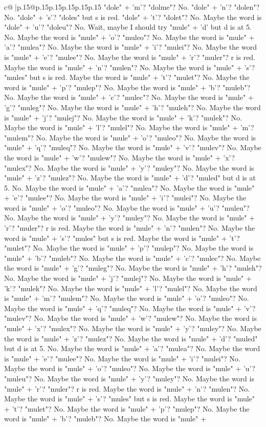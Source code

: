 \documentclass{article}
\begin{document}
{\begin{supertabular}{c@{$\;$}|p{.15\linewidth}@{}p{.15\linewidth}p{.15\linewidth}p{.15\linewidth}p{.15\linewidth}p{.15\linewidth}}
{{{"dole" + 'm'? "dolme"? No. "dole" + 'n'? "dolen"? No. "dole" + 's'? "doles" but s is red. "dole" + 't'? "dolet"? No. Maybe the word is "dole" + 'u'? "doleu"? No. Wait, maybe I should try "mule" + 'd' but d is at 5. No. Maybe the word is "mule" + 'o'? "muleo"? No. Maybe the word is "mule" + 'a'? "mulea"? No. Maybe the word is "mule" + 'i'? "mulei"? No. Maybe the word is "mule" + 'e'? "mulee"? No. Maybe the word is "mule" + 'r'? "muler"? r is red. Maybe the word is "mule" + 'n'? "mulen"? No. Maybe the word is "mule" + 's'? "mules" but s is red. Maybe the word is "mule" + 't'? "mulet"? No. Maybe the word is "mule" + 'p'? "mulep"? No. Maybe the word is "mule" + 'b'? "muleb"? No. Maybe the word is "mule" + 'c'? "mulec"? No. Maybe the word is "mule" + 'g'? "muleg"? No. Maybe the word is "mule" + 'h'? "muleh"? No. Maybe the word is "mule" + 'j'? "mulej"? No. Maybe the word is "mule" + 'k'? "mulek"? No. Maybe the word is "mule" + 'l'? "mulel"? No. Maybe the word is "mule" + 'm'? "mulem"? No. Maybe the word is "mule" + 'o'? "muleo"? No. Maybe the word is "mule" + 'q'? "muleq"? No. Maybe the word is "mule" + 'v'? "mulev"? No. Maybe the word is "mule" + 'w'? "mulew"? No. Maybe the word is "mule" + 'x'? "mulex"? No. Maybe the word is "mule" + 'y'? "muley"? No. Maybe the word is "mule" + 'z'? "mulez"? No. Maybe the word is "mule" + 'd'? "muled" but d is at 5. No. Maybe the word is "mule" + 'a'? "mulea"? No. Maybe the word is "mule" + 'e'? "mulee"? No. Maybe the word is "mule" + 'i'? "mulei"? No. Maybe the word is "mule" + 'o'? "muleo"? No. Maybe the word is "mule" + 'u'? "muleu"? No. Maybe the word is "mule" + 'y'? "muley"? No. Maybe the word is "mule" + 'r'? "muler"? r is red. Maybe the word is "mule" + 'n'? "mulen"? No. Maybe the word is "mule" + 's'? "mules" but s is red. Maybe the word is "mule" + 't'? "mulet"? No. Maybe the word is "mule" + 'p'? "mulep"? No. Maybe the word is "mule" + 'b'? "muleb"? No. Maybe the word is "mule" + 'c'? "mulec"? No. Maybe the word is "mule" + 'g'? "muleg"? No. Maybe the word is "mule" + 'h'? "muleh"? No. Maybe the word is "mule" + 'j'? "mulej"? No. Maybe the word is "mule" + 'k'? "mulek"? No. Maybe the word is "mule" + 'l'? "mulel"? No. Maybe the word is "mule" + 'm'? "mulem"? No. Maybe the word is "mule" + 'o'? "muleo"? No. Maybe the word is "mule" + 'q'? "muleq"? No. Maybe the word is "mule" + 'v'? "mulev"? No. Maybe the word is "mule" + 'w'? "mulew"? No. Maybe the word is "mule" + 'x'? "mulex"? No. Maybe the word is "mule" + 'y'? "muley"? No. Maybe the word is "mule" + 'z'? "mulez"? No. Maybe the word is "mule" + 'd'? "muled" but d is at 5. No. Maybe the word is "mule" + 'a'? "mulea"? No. Maybe the word is "mule" + 'e'? "mulee"? No. Maybe the word is "mule" + 'i'? "mulei"? No. Maybe the word is "mule" + 'o'? "muleo"? No. Maybe the word is "mule" + 'u'? "muleu"? No. Maybe the word is "mule" + 'y'? "muley"? No. Maybe the word is "mule" + 'r'? "muler"? r is red. Maybe the word is "mule" + 'n'? "mulen"? No. Maybe the word is "mule" + 's'? "mules" but s is red. Maybe the word is "mule" + 't'? "mulet"? No. Maybe the word is "mule" + 'p'? "mulep"? No. Maybe the word is "mule" + 'b'? "muleb"? No. Maybe the word is "mule" + }}}
\end{supertabular}}
\end{document}
